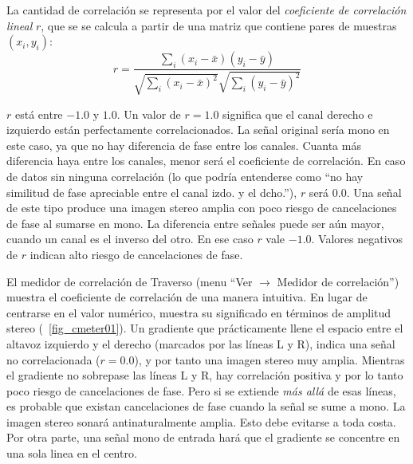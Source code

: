 La cantidad de correlación se representa por el valor del \emph{coeficiente de correlación lineal} $r$, que se se calcula a partir de una matriz que contiene pares de muestras $(x_i,y_i)$:
\[
r = \frac{\sum\limits_{i}(x_i - \bar{x})(y_i - \bar{y})}{\sqrt{\sum\limits_{i}(x_i - \bar{x})^2} \sqrt{\sum\limits_{i}(y_i - \bar{y})^2}}
\]

$r$ está entre $-1.0$ y $1.0$. Un valor de $r = 1.0$ significa que el canal derecho e izquierdo están perfectamente correlacionados. La señal original sería mono en este caso, ya que no hay diferencia de fase entre los canales. Cuanta más diferencia haya entre los canales, menor será el coeficiente de correlación. En caso de datos sin ninguna correlación (lo que podría entenderse como ``no hay similitud de fase apreciable entre el canal izdo. y el dcho.''), $r$ será 0.0. Una señal de este tipo produce una imagen stereo amplia con poco riesgo de cancelaciones de fase al sumarse en mono. La diferencia entre señales puede ser aún mayor, cuando un canal es el inverso del otro. En ese caso $r$ vale $-1.0$. Valores negativos de $r$ indican alto riesgo de cancelaciones de fase.

El medidor de correlación de Traverso (menu ``Ver $\rightarrow$ Medidor de correlación'') muestra el coeficiente de correlación de una manera intuitiva. En lugar de centrarse en el valor numérico, muestra su significado en términos de amplitud stereo (\FigB\ \ref{fig_cmeter01}). Un gradiente que prácticamente llene el espacio entre el altavoz izquierdo y el derecho (marcados por las líneas L y R), indica una señal no correlacionada ($r = 0.0$), y por tanto una imagen stereo muy amplia. Mientras el gradiente no sobrepase las líneas L y R, hay correlación positiva y por lo tanto poco riesgo de cancelaciones de fase. Pero si se extiende \emph{más allá} de esas líneas, es probable que existan cancelaciones de fase cuando la señal se sume a mono. La imagen stereo sonará antinaturalmente amplia. Esto debe evitarse a toda costa. Por otra parte, una señal mono de entrada hará que el gradiente se concentre en una sola linea en el centro.


